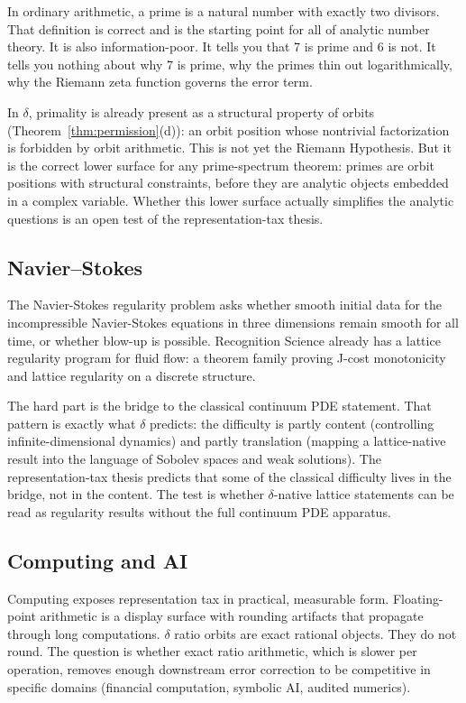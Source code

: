 \documentclass[11pt,a4paper]{article}
\theoremstyle{definition}
\theoremstyle{remark}
\begin{document}
In ordinary arithmetic, a prime is a natural number with exactly two divisors.
That definition is correct and is the starting point for all of analytic number
theory. It is also information-poor. It tells you that 7 is prime and 6 is
not. It tells you nothing about why 7 is prime, why the primes thin out
logarithmically, why the Riemann zeta function governs the error term.

In $\delta$, primality is already present as a structural property of orbits
(Theorem~\ref{thm:permission}(d)): an orbit position whose nontrivial
factorization is forbidden by orbit arithmetic. This
is not yet the Riemann Hypothesis. But it is the correct lower surface for any
prime-spectrum theorem: primes are orbit positions with structural constraints,
before they are analytic objects embedded in a complex variable. Whether this
lower surface actually simplifies the analytic questions is an open test of
the representation-tax thesis.

\subsection{Navier--Stokes}

The Navier-Stokes regularity problem asks whether smooth initial data for the
incompressible Navier-Stokes equations in three dimensions remain smooth for
all time, or whether blow-up is possible. Recognition Science already has a
lattice regularity program for fluid flow: a theorem family proving
J-cost monotonicity and lattice regularity on a discrete structure.

The hard part is the bridge to the classical continuum PDE statement. That
pattern is exactly what $\delta$ predicts: the difficulty is partly content
(controlling infinite-dimensional dynamics) and partly translation (mapping
a lattice-native result into the language of Sobolev spaces and weak
solutions). The representation-tax thesis predicts that some of the classical
difficulty lives in the bridge, not in the content. The test is whether
$\delta$-native lattice statements can be read as regularity results without
the full continuum PDE apparatus.

\subsection{Computing and AI}

Computing exposes representation tax in practical, measurable form.
Floating-point arithmetic is a display surface with rounding artifacts that
propagate through long computations. $\delta$ ratio orbits are exact rational
objects. They do not round. The question is whether exact ratio arithmetic,
which is slower per operation, removes enough downstream error correction to
be competitive in specific domains (financial computation, symbolic AI,
audited numerics).
\end{document}
